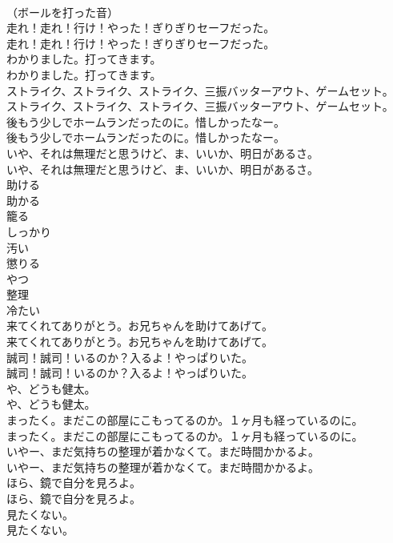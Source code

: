 \documentclass[8pt]{extreport}
\begin{document}
\begin{CJK}{UTF8}{min}
\\	（ボールを打った音）	
\\	走れ！走れ！行け！やった！ぎりぎりセーフだった。	
\\	走れ！走れ！行け！やった！ぎりぎりセーフだった。 
\\	わかりました。打ってきます。	
\\	わかりました。打ってきます。 
\\	ストライク、ストライク、ストライク、三振バッターアウト、ゲームセット。	
\\	ストライク、ストライク、ストライク、三振バッターアウト、ゲームセット。 
\\	後もう少しでホームランだったのに。惜しかったなー。	
\\	後もう少しでホームランだったのに。惜しかったなー。 
\\	いや、それは無理だと思うけど、ま、いいか、明日があるさ。	
\\	いや、それは無理だと思うけど、ま、いいか、明日があるさ。 
\\	助ける
\\	助かる
\\	籠る
\\	しっかり
\\	汚い
\\	懲りる
\\	やつ
\\	整理
\\	冷たい
\\	来てくれてありがとう。お兄ちゃんを助けてあげて。	
\\	来てくれてありがとう。お兄ちゃんを助けてあげて。 
\\	誠司！誠司！いるのか？入るよ！やっぱりいた。	
\\	誠司！誠司！いるのか？入るよ！やっぱりいた。 
\\	や、どうも健太。	
\\	や、どうも健太。 
\\	まったく。まだこの部屋にこもってるのか。１ヶ月も経っているのに。	
\\	まったく。まだこの部屋にこもってるのか。１ヶ月も経っているのに。 
\\	いやー、まだ気持ちの整理が着かなくて。まだ時間かかるよ。	
\\	いやー、まだ気持ちの整理が着かなくて。まだ時間かかるよ。 
\\	ほら、鏡で自分を見ろよ。	
\\	ほら、鏡で自分を見ろよ。 
\\	見たくない。	
\\	見たくない。 

\end{CJK}
\end{document}
